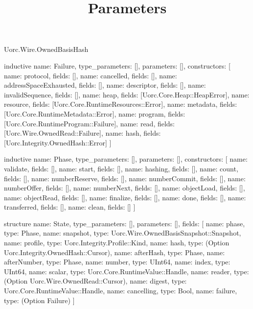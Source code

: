 \begin{lexlean}{Uorc.Wire.OwnedBasisHash}
\title{Parameters}
\begin{semanticmodule}
inductive{
  name: Failure,
  type_parameters: [],
  parameters: [],
  constructors: [
    {name: protocol, fields: []},
    {name: cancelled, fields: []},
    {name: addressSpaceExhausted, fields: []},
    {name: descriptor, fields: []},
    {name: invalidSequence, fields: []},
    {name: heap, fields: [Uorc.Core.Heap::HeapError]},
    {name: resource, fields: [Uorc.Core.RuntimeResources::Error]},
    {name: metadata, fields: [Uorc.Core.RuntimeMetadata::Error]},
    {name: program, fields: [Uorc.Core.RuntimeProgram::Failure]},
    {name: read, fields: [Uorc.Wire.OwnedRead::Failure]},
    {name: hash, fields: [Uorc.Integrity.OwnedHash::Error]}
  ]
}

inductive{
  name: Phase,
  type_parameters: [],
  parameters: [],
  constructors: [
    {name: validate, fields: []},
    {name: start, fields: []},
    {name: hashing, fields: []},
    {name: count, fields: []},
    {name: numberReserve, fields: []},
    {name: numberCommit, fields: []},
    {name: numberOffer, fields: []},
    {name: numberNext, fields: []},
    {name: objectLoad, fields: []},
    {name: objectRead, fields: []},
    {name: finalize, fields: []},
    {name: done, fields: []},
    {name: transferred, fields: []},
    {name: clean, fields: []}
  ]
}

structure{
  name: State,
  type_parameters: [],
  parameters: [],
  fields: [
    {name: phase, type: Phase},
    {name: snapshot, type: Uorc.Wire.OwnedBasisSnapshot::Snapshot},
    {name: profile, type: Uorc.Integrity.Profile::Kind},
    {name: hash, type: (Option Uorc.Integrity.OwnedHash::Cursor)},
    {name: afterHash, type: Phase},
    {name: afterNumber, type: Phase},
    {name: number, type: UInt64},
    {name: index, type: UInt64},
    {name: scalar, type: Uorc.Core.RuntimeValue::Handle},
    {name: reader, type: (Option Uorc.Wire.OwnedRead::Cursor)},
    {name: digest, type: Uorc.Core.RuntimeValue::Handle},
    {name: cancelling, type: Bool},
    {name: failure, type: (Option Failure)}
  ]
}


\end{semanticmodule}
\end{lexlean}

